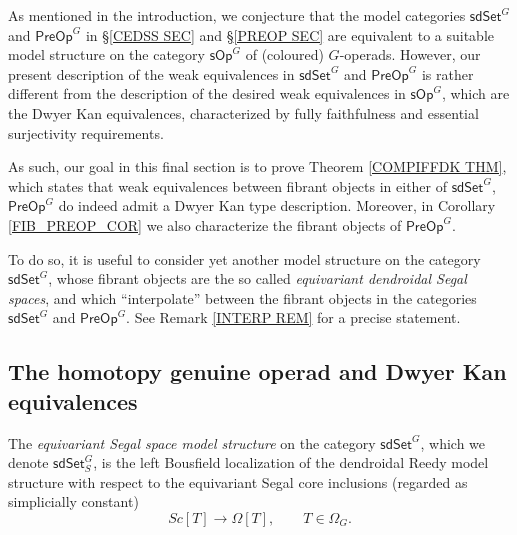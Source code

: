 \documentclass[a4paper,10pt
,draft
]{article}%
\begin{document}
As mentioned in the introduction, we conjecture that the model categories 
$\mathsf{sdSet}^G$ and $\mathsf{PreOp}^G$
in \S \ref{CEDSS SEC} and \S \ref{PREOP SEC}
are equivalent to a suitable model structure on the category 
$\mathsf{sOp}^G$ of (coloured) $G$-operads.
However, our present description of the weak equivalences in 
$\mathsf{sdSet}^G$ and $\mathsf{PreOp}^G$
is rather different from the description of the desired weak equivalences in $\mathsf{sOp}^G$,
which are the Dwyer Kan equivalences, 
characterized by fully faithfulness and essential surjectivity requirements.

As such, our goal in this final section is to prove
Theorem \ref{COMPIFFDK THM},
which states that weak equivalences between fibrant objects in either of $\mathsf{sdSet}^G$, $\mathsf{PreOp}^G$
do indeed admit a Dwyer Kan type description.
Moreover, in Corollary \ref{FIB_PREOP_COR} we also characterize the fibrant objects of $\mathsf{PreOp}^G$.

To do so, it is useful to consider yet another model structure on the category $\mathsf{sdSet}^G$,
whose fibrant objects are the so called
\textit{equivariant dendroidal Segal spaces},
and which ``interpolate''
between the fibrant objects 
in the categories $\mathsf{sdSet}^G$ and $\mathsf{PreOp}^G$.
See Remark \ref{INTERP REM} for a precise statement.



 

\subsection{The homotopy genuine operad and Dwyer Kan equivalences}\label{HMPTYGEN SEC}


\begin{definition}
	The \textit{equivariant Segal space model structure} on the category $\mathsf{sdSet}^G$, which we denote 
	$\mathsf{sdSet}^G_S$, 
	is the left Bousfield localization of the dendroidal Reedy model structure with respect to the equivariant Segal core inclusions (regarded as simplicially constant)
\[
	Sc[T] \to \Omega[T], \qquad T \in \Omega_G.
\]
\end{definition}

\end{document}
